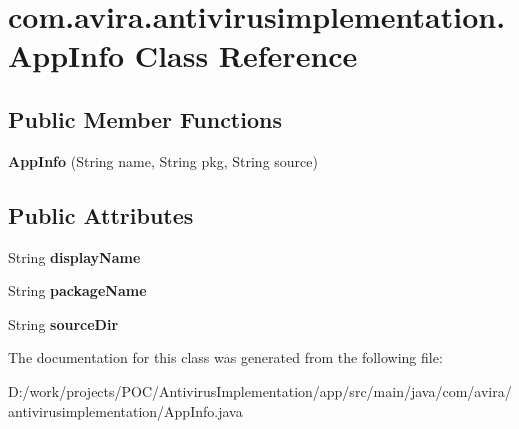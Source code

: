 \hypertarget{classcom_1_1avira_1_1antivirusimplementation_1_1_app_info}{}\section{com.\+avira.\+antivirusimplementation.\+App\+Info Class Reference}
\label{classcom_1_1avira_1_1antivirusimplementation_1_1_app_info}
\subsection*{Public Member Functions}
\begin{DoxyCompactItemize}
\item 
\hypertarget{classcom_1_1avira_1_1antivirusimplementation_1_1_app_info_a18b1feca8a0811d801e9b6b76b2ebc8e}{}{\bfseries App\+Info} (String name, String pkg, String source)\label{classcom_1_1avira_1_1antivirusimplementation_1_1_app_info_a18b1feca8a0811d801e9b6b76b2ebc8e}

\end{DoxyCompactItemize}
\subsection*{Public Attributes}
\begin{DoxyCompactItemize}
\item 
\hypertarget{classcom_1_1avira_1_1antivirusimplementation_1_1_app_info_a9d2b68f4f265b7bdaa9ab72b9a71d46b}{}String {\bfseries display\+Name}\label{classcom_1_1avira_1_1antivirusimplementation_1_1_app_info_a9d2b68f4f265b7bdaa9ab72b9a71d46b}

\item 
\hypertarget{classcom_1_1avira_1_1antivirusimplementation_1_1_app_info_ab6be1b4548c565ddcab63b22fcf417a2}{}String {\bfseries package\+Name}\label{classcom_1_1avira_1_1antivirusimplementation_1_1_app_info_ab6be1b4548c565ddcab63b22fcf417a2}

\item 
\hypertarget{classcom_1_1avira_1_1antivirusimplementation_1_1_app_info_a021d7b81714fe40c15071c8500c0d85f}{}String {\bfseries source\+Dir}\label{classcom_1_1avira_1_1antivirusimplementation_1_1_app_info_a021d7b81714fe40c15071c8500c0d85f}

\end{DoxyCompactItemize}


The documentation for this class was generated from the following file\+:\begin{DoxyCompactItemize}
\item 
D\+:/work/projects/\+P\+O\+C/\+Antivirus\+Implementation/app/src/main/java/com/avira/antivirusimplementation/App\+Info.\+java\end{DoxyCompactItemize}
